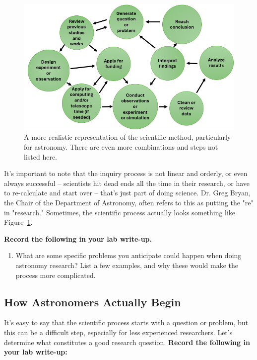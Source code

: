 \documentclass[11pt]{article}%
\begin{document}
 \begin{figure}
     \centering
     \includegraphics[width=0.75\linewidth]{Images/scientificmethod.png}
     \caption{A more realistic representation of the scientific method, particularly for astronomy. There are even more combinations and steps not listed here.}
     \label{fig:scientificmethod}
 \end{figure}

It’s important to note that the inquiry process is not linear and orderly, or even always successful -- scientists hit dead ends all the time in their research, or have to re-calculate and start over -- that's just part of doing science. Dr. Greg Bryan, the Chair of the Department of Astronomy, often refers to this as putting the "re" in "research."  Sometimes, the scientific process actually looks something like Figure~\ref{fig:scientificmethod}. %

\newpage

\textbf{Record the following in your lab write-up.}

\begin{enumerate}
\setcounter{enumi}{0}

\item What are some specific problems you anticipate could happen when doing astronomy research? List a few examples, and why these would make the process more complicated.
 
\end{enumerate}

\subsection{How Astronomers Actually Begin}

It's easy to say that the scientific process starts with a question or problem, but this can be a difficult step, especially for less experienced researchers. Let's determine what constitutes a good research question. \textbf{Record the following in your lab write-up:}
\end{document}
